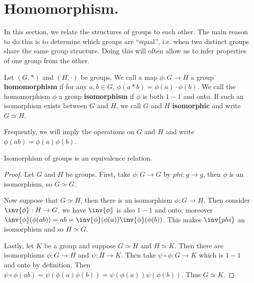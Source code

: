 \section{Homomorphism.}
\label{section1}

In this section, we relate the structures of groups to each other. The main
reason to do this is to determine which groups are ``equal'', i.e. when two
distinct groups share the same group structure. Doing this will often allow us
to infer properties of one group from the other.

\begin{definition}
    Let $(G, \ast)$ and $(H, \cdot)$ be groups. We call a map $\phi:G
    \rightarrow H$ a group \textbf{homomorphism} if for any $a,b \in G$,
    $\phi(a \ast b)=\phi(a) \cdot \phi(b)$. We call the homomorphism $\phi$ a
    group  \textbf{isomorphism} if $\phi$ is both  $1-1$ and onto. If such an
    isomorphism exists between  $G$ and  $H$, we call  $G$ and  $H$
    \textbf{isomorphic} and write $G \simeq H$.
\end{definition}
\begin{remark}
    Frequently, we will imply the operations on $G$ and  $H$ and write
    $\phi(ab)=\phi(a)\phi(b)$.
\end{remark}

\begin{lemma}\label{1.6.1}
    Isomorphism of groups is an equivalence relation.
\end{lemma}
\begin{proof}
    Let $G$ and  $H$ be groups. First, take $\phi:G \rightarrow G$ by $phi:g
    \rightarrow g$, then $\phi$ is an isomorphism, so $G \simeq G$.

    Now suppose that  $G \simeq H$, then there is an isomorphism  $\phi:G
    \rightarrow H$. Then consider $\inv{\phi}:H \rightarrow G$, we have
    $\inv{\phi}$ is also $1-1$ and onto; moreover
    $\inv{\phi}(\phi(ab))=ab=\inv{\phi}(\phi(a))\inv{\phi}(\phi(b))$. This makes
    $\inv{phi}$ an isomorphism and so $H \simeq G$.

    Lastly, let  $K$ be a group and suppose  $G \simeq H$ and  $H \simeq K$.
    Then there are isomorphisms  $\phi:G \rightarrow H$ and $\psi:H \rightarrow
    K$. Then take $\psi \circ \phi:G \rightarrow K$ which is $1-1$ and onto by
    definition. Then $\psi \circ
    \phi(ab)=\psi(\phi(a)\phi(b))=\psi(\phi(a))\psi(\phi(b))$. Thus $G \simeq
    K$.
\end{proof}

